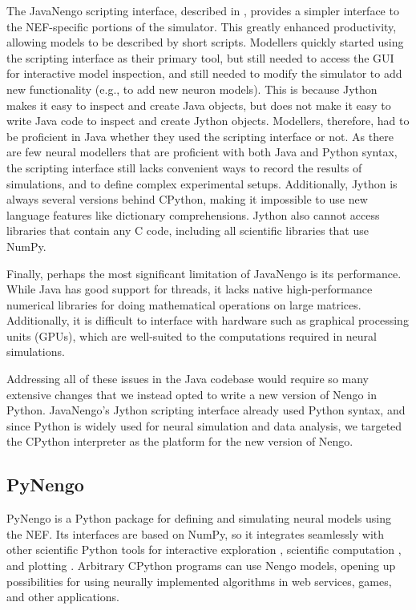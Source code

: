 \documentclass{frontiersSCNS}
\begin{document}
The JavaNengo scripting interface,
described in \cite{TODO},
provides a simpler interface
to the NEF-specific portions of the simulator.
This greatly enhanced productivity,
allowing models to be described
by short scripts.
Modellers quickly started using
the scripting interface
as their primary tool,
but still needed to access the GUI
for interactive model inspection,
and still needed to modify the simulator
to add new functionality
(e.g., to add new neuron models).
This is because Jython makes it easy
to inspect and create Java objects,
but does not make it easy to
write Java code to
inspect and create Jython objects.
Modellers, therefore, had to be
proficient in Java whether
they used the scripting interface or not.
As there are few neural modellers
that are proficient with both Java and Python syntax,
the scripting interface still lacks
convenient ways to record the results of simulations,
and to define complex experimental setups.
Additionally, Jython is always several versions
behind CPython, making it impossible
to use new language features
like dictionary comprehensions.
Jython also cannot access libraries
that contain any C code,
including all scientific libraries
that use NumPy.

Finally, perhaps the most significant limitation
of JavaNengo is its performance.
While Java has good support for threads,
it lacks native high-performance numerical libraries
for doing mathematical operations on large matrices.
Additionally, it is difficult to interface with
hardware such as graphical processing units (GPUs),
which are well-suited to the computations
required in neural simulations.

Addressing all of these issues
in the Java codebase would require
so many extensive changes
that we instead opted
to write a new version of Nengo in Python.
JavaNengo's Jython scripting interface
already used Python syntax,
and since Python is widely used
for neural simulation and data analysis,
we targeted the CPython interpreter
as the platform for the new version of Nengo.

\subsection{PyNengo}

PyNengo is a Python package for
defining and simulating
neural models using the NEF.
Its interfaces are based on NumPy,
so it integrates seamlessly
with other scientific Python tools
for interactive exploration \cite{TODO}, %
scientific computation \cite{TODO}, %
and plotting \cite{TODO}. %
Arbitrary CPython programs
can use Nengo models,
opening up possibilities
for using neurally implemented algorithms
in web services, games, and other applications.
\end{document}
